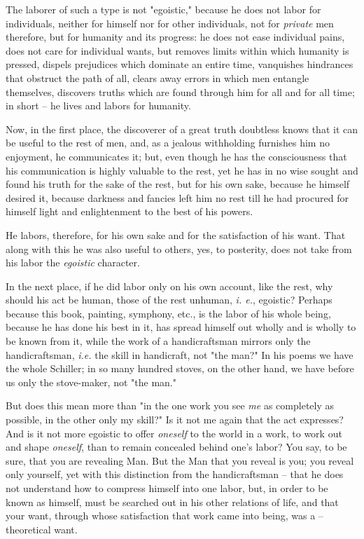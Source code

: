 The laborer of such a type is not "{}egoistic,"{} because he does not labor 
for individuals, neither for himself nor for other individuals, not for 
\textit{private} men therefore, but for humanity and its progress: he does not 
ease individual pains, does not care for individual wants, but removes limits 
within which humanity is pressed, dispels prejudices which dominate an entire 
time, vanquishes hindrances that obstruct the path of all, clears away errors 
in which men entangle themselves, discovers truths which are found through him 
for all and for all time; in short -- he lives and labors for humanity.

Now, in the first place, the discoverer of a great truth doubtless knows that 
it can be useful to the rest of men, and, as a jealous withholding furnishes 
him no enjoyment, he communicates it; but, even though he has the 
consciousness that his communication is highly valuable to the rest, yet he 
has in no wise sought and found his truth for the sake of the rest, but for 
his own sake, because he himself desired it, because darkness and fancies left 
him no rest till he had procured for himself light and enlightenment to the 
best of his powers.

He labors, therefore, for his own sake and for the satisfaction of his want. 
That along with this he was also useful to others, yes, to posterity, does not 
take from his labor the \textit{egoistic} character.

In the next place, if he did labor only on his own account, like the rest, why 
should his act be human, those of the rest unhuman, \textit{i. e.}, egoistic? 
Perhaps because this book, painting, symphony, etc., is the labor of his whole 
being, because he has done his best in it, has spread himself out wholly and 
is wholly to be known from it, while the work of a handicraftsman mirrors only 
the handicraftsman, \textit{i.e.} the skill in handicraft, not "{}the man?"{} 
In his poems we have the whole Schiller; in so many hundred stoves, on the 
other hand, we have before us only the stove-maker, not "{}the man."{}

But does this mean more than "{}in the one work you see \textit{me} as 
completely as possible, in the other only my skill?"{} Is it not me again that 
the act expresses? And is it not more egoistic to offer \textit{oneself} to 
the world in a work, to work out and shape \textit{oneself}, than to remain 
concealed behind one's labor? You say, to be sure, that you are revealing Man. 
But the Man that you reveal is you; you reveal only yourself, yet with this 
distinction from the handicraftsman -- that he does not understand how to 
compress himself into one labor, but, in order to be known as himself, must be 
searched out in his other relations of life, and that your want, through whose 
satisfaction that work came into being, was a -- theoretical want.

